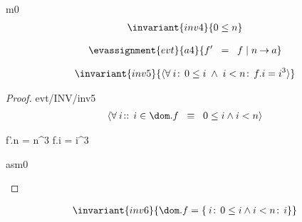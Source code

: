 \documentclass[12pt]{amsart}
\begin{document}
\begin{machine}{m0}
\begin{align*}
\invariant{inv4}
{ 0 \le n }
\end{align*}

\begin{align*}
\evassignment{evt}{a4}
{ f' \2 = f \1 | n \tfun a }
\end{align*}

\begin{align*}
\invariant{inv5}
{	\qforall{i}{0 \le i \1\land i < n}{ f.i = i^3 }		}
\end{align*}

\begin{proof}{evt/INV/inv5}
	\begin{align}
	\assert{asm0}{ \qforall{i}{}{ i \in \dom.f \2\equiv 0 \le i \land i < n } }
	\end{align}
	\begin{calculation}
	\hint{=}{ \ref{a0} }
		 \2 \land f'.n = n^3
			{ f.i = i^3 } 
	\hint{=}{ \ref{inv5} }
		\true
	\end{calculation}
	\begin{subproof}{asm0}
	\easy
	\end{subproof}
\end{proof}

\begin{align*}
\invariant{inv6}
{	\dom.f = \qset{i}{0 \le i \land i < n }{ i }		}
\end{align*}

\end{machine}
\end{document}
